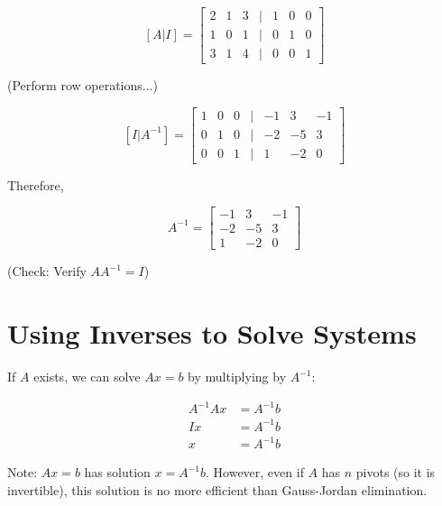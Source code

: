 \documentclass[12pt,a4paper]{article}
\begin{document}
\[[A|I] = \begin{bmatrix} 
2 & 1 & 3 & | & 1 & 0 & 0 \\
1 & 0 & 1 & | & 0 & 1 & 0 \\
3 & 1 & 4 & | & 0 & 0 & 1
\end{bmatrix}\]

(Perform row operations...)

\[[I|A^{-1}] = \begin{bmatrix}
1 & 0 & 0 & | & -1 & 3 & -1 \\
0 & 1 & 0 & | & -2 & -5 & 3 \\
0 & 0 & 1 & | & 1 & -2 & 0
\end{bmatrix}\]

Therefore, 

\[A^{-1} = \begin{bmatrix} -1 & 3 & -1 \\ -2 & -5 & 3 \\ 1 & -2 & 0 \end{bmatrix}\]

(Check: Verify $AA^{-1} = I$)

\section{Using Inverses to Solve Systems}

If $A$ exists, we can solve $Ax = b$ by multiplying by $A^{-1}$:

\begin{align*}
A^{-1}Ax &= A^{-1}b \\
Ix &= A^{-1}b \\
x &= A^{-1}b
\end{align*}

Note: $Ax = b$ has solution $x = A^{-1}b$. However, even if $A$ has $n$ pivots (so it is invertible), this solution is no more efficient than Gauss-Jordan elimination.
\end{document}
